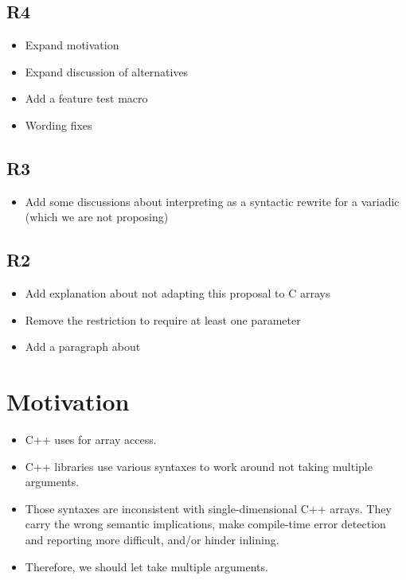 \documentclass{wg21}
\begin{document}
\subsection{R4}

\begin{itemize}
\item Expand motivation
\item Expand discussion of alternatives
\item Add a feature test macro
\item Wording fixes
\end{itemize}

\subsection{R3}

\begin{itemize}
\item Add some discussions about interpreting  as a syntactic rewrite for a variadic  (which we are not proposing)
\end{itemize}

\subsection{R2}

\begin{itemize}
    \item Add explanation about not adapting this proposal to C arrays
    \item Remove the restriction to require at least one parameter
    \item Add a paragraph about 
\end{itemize}

\section{Motivation}

\begin{itemize}
\item C++ uses  for array access.
\item C++ libraries use various syntaxes to work around  not taking multiple arguments.
\item Those syntaxes are inconsistent with single-dimensional C++ arrays.
  They carry the wrong semantic implications,
  make compile-time error detection and reporting more difficult,
  and/or hinder inlining.
\item Therefore, we should let  take multiple arguments.
\end{itemize}
\end{document}
